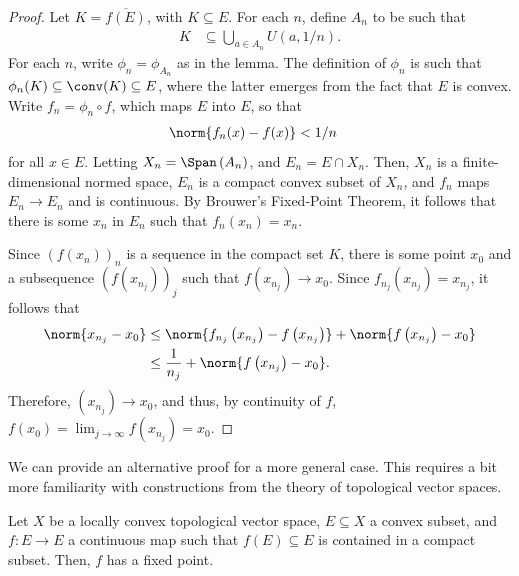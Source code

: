 \documentclass[10pt]{mypackage}
\begin{document}
\begin{proof}
  Let $K = \overline{f(E)}$, with $K\subseteq E$. For each $n$, define $A_n$ to be such that
  \begin{align*}
    K &\subseteq \bigcup_{a\in A_n} U\left( a,1/n \right).
  \end{align*}
  For each $n$, write $\phi_n = \phi_{A_n}$ as in the lemma. The definition of $\phi_n$ is such that $\phi_n(K)\subseteq \conv(K)\subseteq E$, where the latter emerges from the fact that $E$ is convex. Write $f_n = \phi_n\circ f$, which maps $E$ into $E$, so that
  \begin{align*}
    \norm{f_n(x) - f(x)} &< 1/n
  \end{align*}
  for all $x\in E$. Letting $X_n = \Span\left( A_n \right)$, and $E_n = E\cap X_n$. Then, $X_n$ is a finite-dimensional normed space, $E_n$ is a compact convex subset of $X_n$, and $f_n$ maps $E_n\rightarrow E_n$ and is continuous. By Brouwer's Fixed-Point Theorem, it follows that there is some $x_n$ in $E_n$ such that $f_n\left( x_n \right) = x_n$.

  Since $\left( f\left( x_n \right) \right)_n$ is a sequence in the compact set $K$, there is some point $x_0$ and a subsequence $\left( f\left( x_{n_j} \right) \right)_j$ such that $f\left( x_{n_j} \right)\rightarrow x_0$. Since $f_{n_j}\left( x_{n_j} \right) = x_{n_j}$, it follows that
  \begin{align*}
    \norm{x_{n_j} - x_0} &\leq \norm{f_{n_j}\left( x_{n_j} \right) - f\left( x_{n_j} \right)} + \norm{f\left( x_{n_j} \right) - x_0}\\
                         &\leq \frac{1}{n_j} + \norm{f \left( x_{n_j} \right) - x_0}.
  \end{align*}
  Therefore, $\left( x_{n_j} \right) \rightarrow x_0$, and thus, by continuity of $f$, $f\left( x_0 \right) = \lim_{j\rightarrow\infty}f\left( x_{n_j} \right) = x_0$.
\end{proof}
We can provide an alternative proof for a more general case. This requires a bit more familiarity with constructions from the theory of topological vector spaces.
\begin{theorem}
  Let $X$ be a locally convex topological vector space, $E\subseteq X$ a convex subset, and $f\colon E\rightarrow E$ a continuous map such that $f(E)\subseteq E$ is contained in a compact subset. Then, $f$ has a fixed point.
\end{theorem}
\end{document}
